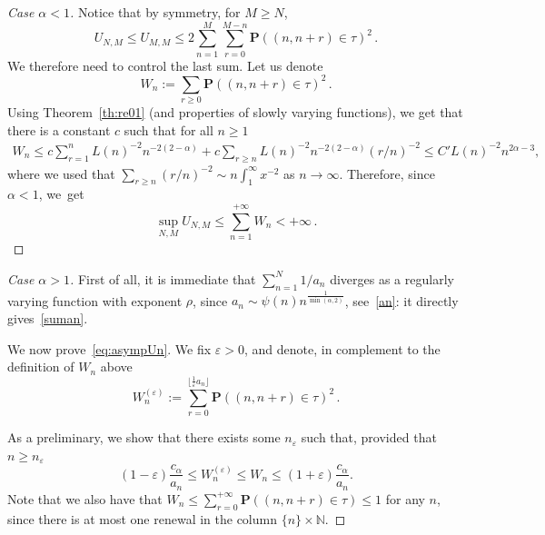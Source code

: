 \documentclass[AHL,Unicode,longabstracts]{cedram}
\newenvironment{step}[1]{\begin{proof}[#1]}{\let\qed\relax\end{proof}}
\newcommand{\ga}{\alpha}
\newcommand{\gep}{\varepsilon}
\newcommand{\bP}{\ensuremath{\mathbf{P}}}
\newcommand{\bbN}{\ensuremath{\mathbb{N}}}
\begin{document}
\begin{appendix}
\begin{proofc}

\begin{step}{Case $\ga<1$}
Notice that by symmetry, for $M\geq N$,
\[
U_{N,M} \leq U_{M,M} \leq 2 \sum_{n=1}^M \sum_{r=0}^{M-n} \bP((n,n+r) \in\tau)^2\,.
\]
We therefore need to control the last sum. Let us denote
\[
W_n:=\sum_{r\geq 0} \bP((n,n+r) \in\tau)^2\,.
\]
Using Theorem~\ref{th:re01} (and properties of slowly varying functions), we get that there is a constant $c$ such that for all $n\geq 1$
\begin{align*}
W_n \leq c\sum_{r=1}^n L(n)^{-2} n^{-2(2-\ga)} + c\sum_{r\geq n} L(n)^{-2} n^{-2(2-\ga)} (r/n)^{-2}
\leq C' L(n)^{-2} n^{ 2\ga -3},
\end{align*}
where we used that $\sum_{r\geq n} (r/n)^{-2} \sim n \int_1^{\infty} x^{-2}$ as $n\to\infty$. Therefore, since $\ga<1$, we~get
\[
\sup_{N,M} U_{N,M} \leq \sum_{n=1}^{+\infty} W_n <+\infty\,.
\]
\end{step}

\begin{step}{Case $\ga > 1$}
First of all, it is immediate that $\sum_{n=1}^N 1/a_n$ diverges as a regularly varying function with exponent $\rho$, since $a_n \sim \psi(n) n^{\frac{1}{\min(\ga,2)}}$, see~\eqref{an}: it directly gives~\eqref{suman}.



We now prove~\eqref{eq:asympUn}. We fix $\gep>0$, and denote, in complement to the definition of $W_n$ above
\[
W_n^{(\gep)} := \sum_{r = 0}^{\lfloor \frac1\gep a_n \rfloor} \bP((n,n+r) \in \tau)^2\,.
\]


As a preliminary, we show that there exists some $n_\gep$ such that, provided that~$n\geq n_{\gep}$
\begin{equation}\label{eq:sumk}
(1-\gep) \frac{c_{\ga}}{a_n} \leq W_n^{(\gep)} \leq W_n \leq (1+\gep) \frac{c_{\ga}}{a_n}.
\end{equation}
Note that we also have that $W_n \leq \sum_{r = 0}^{+\infty} \bP((n,n+r) \in \tau) \leq 1$ for any $n$, since there is at most one renewal in the column $\{n\}\times \bbN$.



\end{step}
\end{proofc}
\end{appendix}
\end{document}
